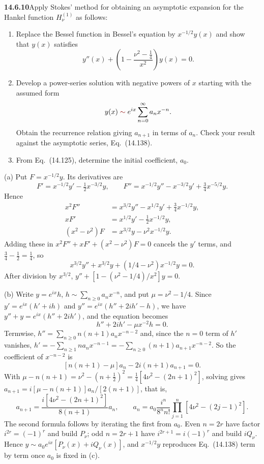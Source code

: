 \par\bigskip
\noindent\textbf{14.6.10}\quad Apply Stokes' method for obtaining an
asymptotic expansion for the Hankel function $H_{\nu}^{(1)}$ as
follows:
\begin{enumerate}
\item[(a)] Replace the Bessel function in Bessel's equation by
$x^{-1/2}y(x)$ and show that $y(x)$ satisfies
\[
y''(x)+\left(1-\frac{\nu^{2}-\frac{1}{4}}{x^{2}}\right)y(x)=0.
\]
\item[(b)] Develop a power-series solution with negative powers of $x$
starting with the assumed form
\[
y(x)\mathrel{\erratum{\sim}}e^{ix}\sum_{n=0}^{\infty}a_{n}x^{-n}.
\]
Obtain the recurrence relation giving $a_{n+1}$ in terms of $a_{n}$.
Check your result against the asymptotic series, Eq.~(14.138).
\item[(c)] From Eq.~(14.125), determine the initial coefficient,
$a_{0}$.
\end{enumerate}
\par{}
\solution
(a) Put $F=x^{-1/2}y$. Its derivatives are
\[
F'=x^{-1/2}y'-\tfrac12x^{-3/2}y,\qquad
F''=x^{-1/2}y''-x^{-3/2}y'+\tfrac34x^{-5/2}y.
\]
Hence
\begin{align*}
x^2F''&=x^{3/2}y''-x^{1/2}y'+\tfrac34x^{-1/2}y,\\
xF'&=x^{1/2}y'-\tfrac12x^{-1/2}y,\\
(x^2-\nu^2)F&=x^{3/2}y-\nu^2x^{-1/2}y.
\end{align*}
Adding these in $x^2F''+xF'+(x^2-\nu^2)F=0$ cancels
the $y'$ terms, and $\frac34-\frac12=\frac14$, so
\[
x^{3/2}y''+x^{3/2}y+(1/4-\nu^2)x^{-1/2}y=0.
\]
After division by $x^{3/2}$,
$\boxed{y''+[1-(\nu^2-1/4)/x^2]y=0}$.

(b) Write $y=e^{ix}h$, $h\sim\sum_{n\ge0}a_nx^{-n}$,
and put $\mu=\nu^2-1/4$. Since $y'=e^{ix}(h'+ih)$ and
$y''=e^{ix}(h''+2ih'-h)$, we have
$y''+y=e^{ix}(h''+2ih')$, and the equation becomes
\[
h''+2ih'-\mu x^{-2}h=0.
\]
Termwise, $h''=\sum_{n\ge0}n(n+1)a_nx^{-n-2}$ and, since the
$n=0$ term of $h'$ vanishes, $h'=-\sum_{n\ge1}na_nx^{-n-1}
=-\sum_{n\ge0}(n+1)a_{n+1}x^{-n-2}$. So the coefficient of
$x^{-n-2}$ is
\[
[n(n+1)-\mu]a_n-2i(n+1)a_{n+1}=0.
\]
With $\mu-n(n+1)=\nu^2-(n+\frac12)^2=\frac14[4\nu^2-(2n+1)^2]$,
solving gives $a_{n+1}=i[\mu-n(n+1)]a_n/[2(n+1)]$, that is,
\[
\boxed{a_{n+1}=\frac{i[4\nu^2-(2n+1)^2]}{8(n+1)}a_n},
\qquad
a_n=a_0\frac{i^n}{8^nn!}
\prod_{j=1}^n[4\nu^2-(2j-1)^2].
\]
The second formula follows by iterating the first from $a_0$.
Even $n=2r$ have factor $i^{2r}=(-1)^r$ and build $P_\nu$;
odd $n=2r+1$ have $i^{2r+1}=i(-1)^r$ and build $iQ_\nu$.
Hence $y\sim a_0e^{ix}[P_\nu(x)+iQ_\nu(x)]$, and $x^{-1/2}y$
reproduces Eq.~(14.138) term by term once $a_0$ is fixed in (c).

